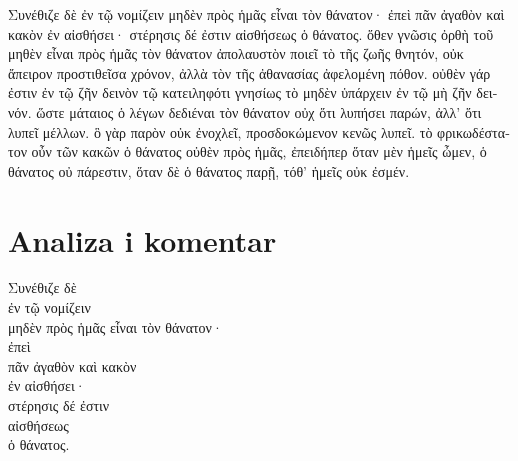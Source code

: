\medskip


{\large

\begin{greek}

\noindent Συνέθιζε δὲ ἐν τῷ νομίζειν μηδὲν πρὸς ἡμᾶς εἶναι τὸν θάνατον· ἐπεὶ πᾶν ἀγαθὸν καὶ κακὸν ἐν αἰσθήσει· στέρησις δέ ἐστιν αἰσθήσεως ὁ θάνατος. ὅθεν γνῶσις ὀρθὴ τοῦ μηθὲν εἶναι πρὸς ἡμᾶς τὸν θάνατον ἀπολαυστὸν ποιεῖ τὸ τῆς ζωῆς θνητόν, οὐκ ἄπειρον προστιθεῖσα χρόνον, ἀλλὰ τὸν τῆς ἀθανασίας ἀφελομένη πόθον. οὐθὲν γάρ ἐστιν ἐν τῷ ζῆν δεινὸν τῷ κατειληφότι γνησίως τὸ μηδὲν ὑπάρχειν ἐν τῷ μὴ ζῆν δεινόν. ὥστε μάταιος ὁ λέγων δεδιέναι τὸν θάνατον οὐχ ὅτι λυπήσει παρών, ἀλλ' ὅτι λυπεῖ μέλλων. ὃ γὰρ παρὸν οὐκ ἐνοχλεῖ, προσδοκώμενον κενῶς λυπεῖ. τὸ φρικωδέστατον οὖν τῶν κακῶν ὁ θάνατος οὐθὲν πρὸς ἡμᾶς, ἐπειδήπερ ὅταν μὲν ἡμεῖς ὦμεν, ὁ θάνατος οὐ πάρεστιν, ὅταν δὲ ὁ θάνατος παρῇ, τόθ' ἡμεῖς οὐκ ἐσμέν.

\end{greek}

}


\section*{Analiza i komentar}


{\large
\begin{greek}
\noindent Συνέθιζε δὲ \\
\tabto{2em} ἐν τῷ νομίζειν \\
μηδὲν πρὸς ἡμᾶς εἶναι τὸν θάνατον· \\
ἐπεὶ \\
\tabto{2em} πᾶν ἀγαθὸν καὶ κακὸν \\
\tabto{2em} ἐν αἰσθήσει· \\
στέρησις δέ ἐστιν \\
\tabto{2em} αἰσθήσεως \\
ὁ θάνατος.\\

\end{greek}
}

\newpage

